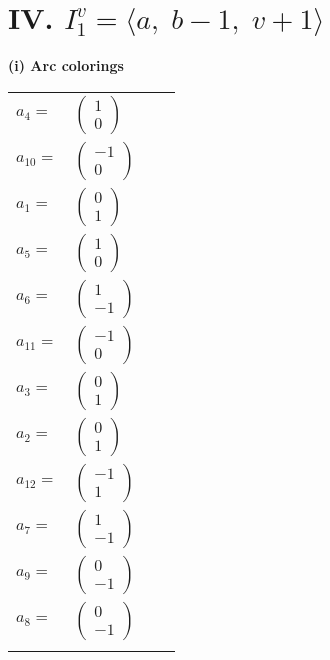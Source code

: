 \documentclass[1p]{elsarticle_modified}
\theoremstyle{definition}
\begin{document}
\centering \section*{IV. $I^v_{1}= \langle a,\;b-1,\;v+1 \rangle$}
\flushleft \textbf{(i) Arc colorings}\\
\begin{tabular}{m{7pt} m{180pt} m{7pt} m{180pt} }
\flushright $a_{4}=$&$\begin{pmatrix}1\\0\end{pmatrix}$ \\
\flushright $a_{10}=$&$\begin{pmatrix}-1\\0\end{pmatrix}$ \\
\flushright $a_{1}=$&$\begin{pmatrix}0\\1\end{pmatrix}$ \\
\flushright $a_{5}=$&$\begin{pmatrix}1\\0\end{pmatrix}$ \\
\flushright $a_{6}=$&$\begin{pmatrix}1\\-1\end{pmatrix}$ \\
\flushright $a_{11}=$&$\begin{pmatrix}-1\\0\end{pmatrix}$ \\
\flushright $a_{3}=$&$\begin{pmatrix}0\\1\end{pmatrix}$ \\
\flushright $a_{2}=$&$\begin{pmatrix}0\\1\end{pmatrix}$ \\
\flushright $a_{12}=$&$\begin{pmatrix}-1\\1\end{pmatrix}$ \\
\flushright $a_{7}=$&$\begin{pmatrix}1\\-1\end{pmatrix}$ \\
\flushright $a_{9}=$&$\begin{pmatrix}0\\-1\end{pmatrix}$ \\
\flushright $a_{8}=$&$\begin{pmatrix}0\\-1\end{pmatrix}$\\&\end{tabular}
\end{document}

